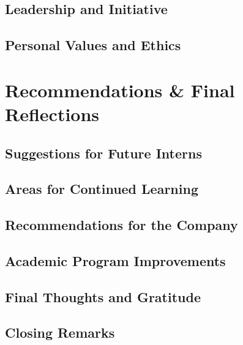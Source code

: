 \subsection{Leadership and Initiative}

\subsection{Personal Values and Ethics}

\section{Recommendations \& Final Reflections}

\subsection{Suggestions for Future Interns}

\subsection{Areas for Continued Learning}

\subsection{Recommendations for the Company}

\subsection{Academic Program Improvements}

\subsection{Final Thoughts and Gratitude}

\subsection{Closing Remarks}
